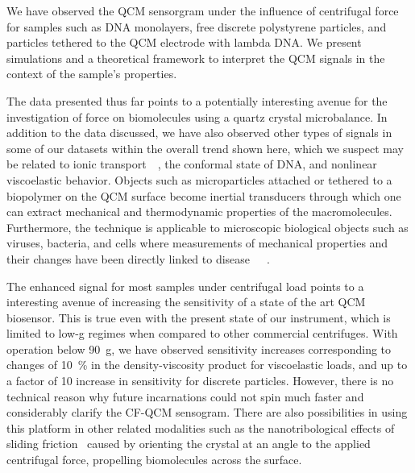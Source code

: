 \documentclass[floatfix,superscriptaddress,a4paper,twocolumn]{revtex4-1}
\begin{document}
We have observed the QCM sensorgram under the influence of centrifugal force
for samples such as DNA monolayers, free discrete polystyrene particles,
and particles tethered to the QCM electrode with lambda DNA.  We present
simulations and a theoretical framework to interpret the QCM signals in the
context of the sample's properties.

The data presented thus far points to a potentially interesting avenue for
the investigation of force on biomolecules using a quartz crystal
microbalance.  In addition to the data discussed, we have also observed
other types of signals in some of our datasets within the overall trend
shown here, which we suspect may be related to ionic
transport~\cite{tolman1911electromotive}~\cite{des1893unpolarisirbare}, the
conformal state of DNA, and nonlinear viscoelastic behavior.  Objects such
as microparticles attached or tethered to a biopolymer on the QCM surface
become inertial transducers through which one can extract mechanical and
thermodynamic properties of the macromolecules. Furthermore, the technique
is applicable to microscopic biological objects such as viruses, bacteria,
and cells where measurements of mechanical properties and their changes
have been directly linked to
disease~\cite{merkel1989molecular}~\cite{yeri2009mutation}~\cite{tevet2011friction}.

The enhanced signal for most samples under centrifugal load points to a
interesting avenue of increasing the sensitivity of a state of the art QCM
biosensor.  This is true even with the present state of our instrument,
which is limited to low-g regimes when compared to other commercial
centrifuges. With operation below \SI{90}{g}, we have observed sensitivity
increases corresponding to changes of \SI{10}{\percent} in the
density-viscosity product for viscoelastic loads, and up to a factor of 10
increase in sensitivity for discrete particles.  However, there is no
technical reason why future incarnations could not spin much faster and
considerably clarify the CF-QCM sensogram.  There are also possibilities in
using this platform in other related modalities such as the
nanotribological effects of sliding friction~\cite{krim1991nanotribology}
caused by orienting the crystal at an angle to the applied centrifugal
force, propelling biomolecules across the surface.
\end{document}
